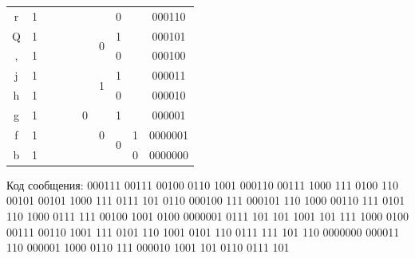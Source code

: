 \documentclass[a4paper,14pt]{extarticle}
\begin{document}
\begin{center}
\begin{tabular}{|c|c|c|c|c|c|c|c|c|c|}
        \cline{1-2} \cline{8-10}
        r                       & 1                            &                             &                      &                    &                    &                    & 0                  &     & 000110  \\
        \cline{1-2} \cline{7-10}
        Q                       & 1                            &                             &                      &                    &                    & \multirow{2}{*}{0} & 1                  &     & 000101  \\
        \cline{1-2} \cline{8-10}
        ,                       & 1                            &                             &                      &                    &                    &                    & 0                  &     & 000100  \\
        \cline{1-2} \cline{6-10}
        j                       & 1                            &                             &                      &                    & \multirow{5}{*}{0} & \multirow{2}{*}{1} & 1                  &     & 000011  \\
        \cline{1-2} \cline{8-10}
        h                       & 1                            &                             &                      &                    &                    &                    & 0                  &     & 000010  \\
        \cline{1-2} \cline{7-10}
        g                       & 1                            &                             &                      &                    &                    & \multirow{3}{*}{0} & 1                  &     & 000001  \\
        \cline{1-2} \cline{8-10}
        f                       & 1                            &                             &                      &                    &                    &                    & \multirow{2}{*}{0} & 1   & 0000001 \\
        \cline{1-2} \cline{9-10}
        b                       & 1                            &                             &                      &                    &                    &                    &                    & 0   & 0000000 \\
        \hline
    \end{tabular}
\end{center}

Код сообщения: 000111 00111 00100 0110 1001 000110 00111 1000 111 0100 110 \\
00101 00101 1000 111 0111 101 0110 000100 111 000101 110 1000 00110 111 0101\\
110 1000 0111 111 00100 1001 0100 0000001 0111 101 101 1001 101 111 1000 0100 \\
00111 00110 1001 111 0101 110 1001 0101 110 0111 111 101 110 0000000 000011 \\
110 000001 1000 0110 111 000010 1001 101 0110 0111 101
\end{document}
